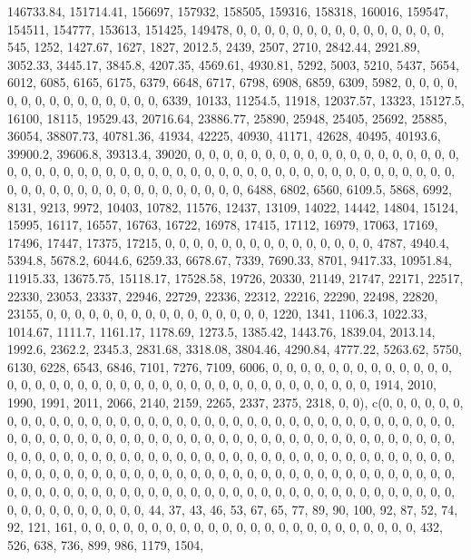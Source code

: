 \documentclass[
]{article}
\begin{document}
146733.84, 151714.41, 156697, 157932, 158505, 159316, 158318, 160016,
159547, 154511, 154777, 153613, 151425, 149478, 0, 0, 0, 0, 0, 0, 0, 0,
0, 0, 0, 0, 0, 0, 0, 545, 1252, 1427.67, 1627, 1827, 2012.5, 2439, 2507,
2710, 2842.44, 2921.89, 3052.33, 3445.17, 3845.8, 4207.35, 4569.61,
4930.81, 5292, 5003, 5210, 5437, 5654, 6012, 6085, 6165, 6175, 6379,
6648, 6717, 6798, 6908, 6859, 6309, 5982, 0, 0, 0, 0, 0, 0, 0, 0, 0, 0,
0, 0, 0, 0, 0, 6339, 10133, 11254.5, 11918, 12037.57, 13323, 15127.5,
16100, 18115, 19529.43, 20716.64, 23886.77, 25890, 25948, 25405, 25692,
25885, 36054, 38807.73, 40781.36, 41934, 42225, 40930, 41171, 42628,
40495, 40193.6, 39900.2, 39606.8, 39313.4, 39020, 0, 0, 0, 0, 0, 0, 0,
0, 0, 0, 0, 0, 0, 0, 0, 0, 0, 0, 0, 0, 0, 0, 0, 0, 0, 0, 0, 0, 0, 0, 0,
0, 0, 0, 0, 0, 0, 0, 0, 0, 0, 0, 0, 0, 0, 0, 0, 0, 0, 0, 0, 0, 0, 0, 0,
0, 0, 0, 0, 0, 0, 0, 0, 0, 0, 0, 0, 0, 6488, 6802, 6560, 6109.5, 5868,
6992, 8131, 9213, 9972, 10403, 10782, 11576, 12437, 13109, 14022, 14442,
14804, 15124, 15995, 16117, 16557, 16763, 16722, 16978, 17415, 17112,
16979, 17063, 17169, 17496, 17447, 17375, 17215, 0, 0, 0, 0, 0, 0, 0, 0,
0, 0, 0, 0, 0, 0, 0, 4787, 4940.4, 5394.8, 5678.2, 6044.6, 6259.33,
6678.67, 7339, 7690.33, 8701, 9417.33, 10951.84, 11915.33, 13675.75,
15118.17, 17528.58, 19726, 20330, 21149, 21747, 22171, 22517, 22330,
23053, 23337, 22946, 22729, 22336, 22312, 22216, 22290, 22498, 22820,
23155, 0, 0, 0, 0, 0, 0, 0, 0, 0, 0, 0, 0, 0, 0, 0, 0, 1220, 1341,
1106.3, 1022.33, 1014.67, 1111.7, 1161.17, 1178.69, 1273.5, 1385.42,
1443.76, 1839.04, 2013.14, 1992.6, 2362.2, 2345.3, 2831.68, 3318.08,
3804.46, 4290.84, 4777.22, 5263.62, 5750, 6130, 6228, 6543, 6846, 7101,
7276, 7109, 6006, 0, 0, 0, 0, 0, 0, 0, 0, 0, 0, 0, 0, 0, 0, 0, 0, 0, 0,
0, 0, 0, 0, 0, 0, 0, 0, 0, 0, 0, 0, 0, 0, 0, 0, 0, 0, 0, 0, 0, 1914,
2010, 1990, 1991, 2011, 2066, 2140, 2159, 2265, 2337, 2375, 2318, 0, 0),
c(0, 0, 0, 0, 0, 0, 0, 0, 0, 0, 0, 0, 0, 0, 0, 0, 0, 0, 0, 0, 0, 0, 0,
0, 0, 0, 0, 0, 0, 0, 0, 0, 0, 0, 0, 0, 0, 0, 0, 0, 0, 0, 0, 0, 0, 0, 0,
0, 0, 0, 0, 0, 0, 0, 0, 0, 0, 0, 0, 0, 0, 0, 0, 0, 0, 0, 0, 0, 0, 0, 0,
0, 0, 0, 0, 0, 0, 0, 0, 0, 0, 0, 0, 0, 0, 0, 0, 0, 0, 0, 0, 0, 0, 0, 0,
0, 0, 0, 0, 0, 0, 0, 0, 0, 0, 0, 0, 0, 0, 0, 0, 0, 0, 0, 0, 0, 0, 0, 0,
0, 0, 0, 0, 0, 0, 0, 0, 0, 0, 0, 0, 0, 0, 0, 0, 0, 0, 0, 0, 0, 0, 0, 0,
0, 0, 0, 0, 0, 0, 0, 0, 0, 0, 0, 0, 0, 0, 0, 0, 0, 0, 0, 0, 0, 0, 0, 0,
0, 0, 0, 0, 0, 0, 0, 0, 0, 44, 37, 43, 46, 53, 67, 65, 77, 89, 90, 100,
92, 87, 52, 74, 92, 121, 161, 0, 0, 0, 0, 0, 0, 0, 0, 0, 0, 0, 0, 0, 0,
0, 0, 0, 0, 0, 0, 0, 0, 0, 0, 432, 526, 638, 736, 899, 986, 1179, 1504,
\end{document}
